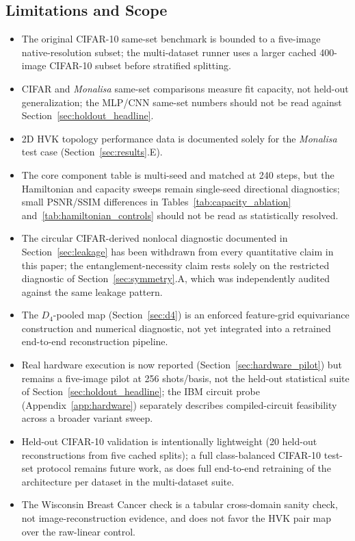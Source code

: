 \documentclass[journal]{IEEEtran}
\begin{document}
\subsection{Limitations and Scope}
\begin{itemize}
    \item The original CIFAR-10 same-set benchmark is bounded to a five-image native-resolution subset; the multi-dataset runner uses a larger cached 400-image CIFAR-10 subset before stratified splitting.
    \item CIFAR and \textit{Monalisa} same-set comparisons measure fit capacity, not held-out generalization; the MLP/CNN same-set numbers should not be read against Section~\ref{sec:holdout_headline}.
    \item 2D HVK topology performance data is documented solely for the \textit{Monalisa} test case (Section~\ref{sec:results}.E).
    \item The core component table is multi-seed and matched at 240 steps, but the Hamiltonian and capacity sweeps remain single-seed directional diagnostics; small PSNR/SSIM differences in Tables~\ref{tab:capacity_ablation} and~\ref{tab:hamiltonian_controls} should not be read as statistically resolved.
    \item The circular CIFAR-derived nonlocal diagnostic documented in Section~\ref{sec:leakage} has been withdrawn from every quantitative claim in this paper; the entanglement-necessity claim rests solely on the restricted diagnostic of Section~\ref{sec:symmetry}.A, which was independently audited against the same leakage pattern.
    \item The $D_4$-pooled map (Section~\ref{sec:d4}) is an enforced feature-grid equivariance construction and numerical diagnostic, not yet integrated into a retrained end-to-end reconstruction pipeline.
    \item Real hardware execution is now reported (Section~\ref{sec:hardware_pilot}) but remains a five-image pilot at 256 shots/basis, not the held-out statistical suite of Section~\ref{sec:holdout_headline}; the IBM circuit probe (Appendix~\ref{app:hardware}) separately describes compiled-circuit feasibility across a broader variant sweep.
    \item Held-out CIFAR-10 validation is intentionally lightweight (20 held-out reconstructions from five cached splits); a full class-balanced CIFAR-10 test-set protocol remains future work, as does full end-to-end retraining of the architecture per dataset in the multi-dataset suite.
    \item The Wisconsin Breast Cancer check is a tabular cross-domain sanity check, not image-reconstruction evidence, and does not favor the HVK pair map over the raw-linear control.
\end{itemize}
\end{document}
